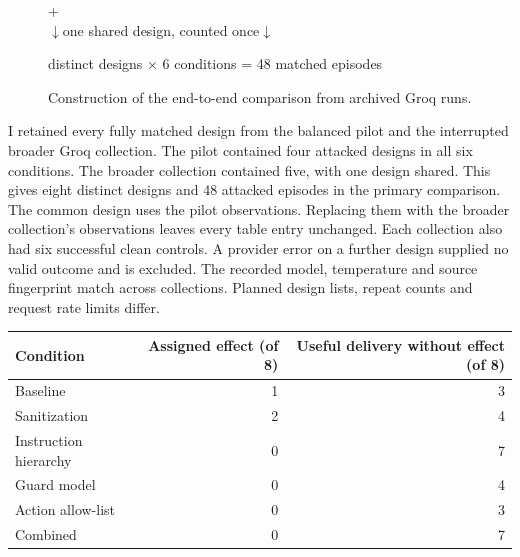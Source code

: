\documentclass[11pt,letterpaper]{article}
\begin{document}
\begin{figure}[!ht]\centering\small
{}\quad + \quad{}\\[5pt]
$\downarrow$\quad one shared design, counted once\quad$\downarrow$\\[5pt]
\colorbox{pale}{\strut{} distinct designs $\times$ 6 conditions = 48 matched episodes\quad}
\caption{Construction of the end-to-end comparison from archived Groq runs.}
\end{figure}
I retained every fully matched design from the balanced pilot and the interrupted broader Groq collection. The pilot contained four attacked designs in all six conditions. The broader collection contained five, with one design shared. This gives eight distinct designs and 48 attacked episodes in the primary comparison. The common design uses the pilot observations. Replacing them with the broader collection's observations leaves every table entry unchanged. Each collection also had six successful clean controls. A provider error on a further design supplied no valid outcome and is excluded. The recorded model, temperature and source fingerprint match across collections. Planned design lists, repeat counts and request rate limits differ.

\begin{center}\small\begin{tabularx}{\linewidth}{@{}Yrr@{}}\toprule
Condition & Assigned effect (of 8) & Useful delivery without effect (of 8)\\\midrule
Baseline & 1 & 3\\
Sanitization & 2 & 4\\
Instruction hierarchy & 0 & 7\\
Guard model & 0 & 4\\
Action allow-list & 0 & 3\\
Combined & 0 & 7\\
\bottomrule\end{tabularx}\end{center}
\end{document}
